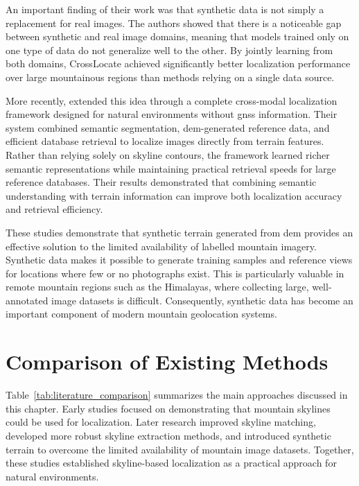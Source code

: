 An important finding of their work was that synthetic data is not simply a replacement for real images. The authors showed that there is a noticeable gap between synthetic and real image domains, meaning that models trained only on one type of data do not generalize well to the other. By jointly learning from both domains, CrossLocate achieved significantly better localization performance over large mountainous regions than methods relying on a single data source.

More recently, \cite{liu2023cmlocate} extended this idea through a complete cross-modal localization framework designed for natural environments without \Gls{gnss} information. Their system combined semantic segmentation, \Gls{dem}-generated reference data, and efficient database retrieval to localize images directly from terrain features. Rather than relying solely on skyline contours, the framework learned richer semantic representations while maintaining practical retrieval speeds for large reference databases. Their results demonstrated that combining semantic understanding with terrain information can improve both localization accuracy and retrieval efficiency.

These studies demonstrate that synthetic terrain generated from \Gls{dem} provides an effective solution to the limited availability of labelled mountain imagery. Synthetic data makes it possible to generate training samples and reference views for locations where few or no photographs exist. This is particularly valuable in remote mountain regions such as the Himalayas, where collecting large, well-annotated image datasets is difficult. Consequently, synthetic data has become an important component of modern mountain geolocation systems.

\section{Comparison of Existing Methods}

Table~\ref{tab:literature_comparison} summarizes the main approaches discussed in this chapter. Early studies focused on demonstrating that mountain skylines could be used for localization. Later research improved skyline matching, developed more robust skyline extraction methods, and introduced synthetic terrain to overcome the limited availability of mountain image datasets. Together, these studies established skyline-based localization as a practical approach for natural environments.

